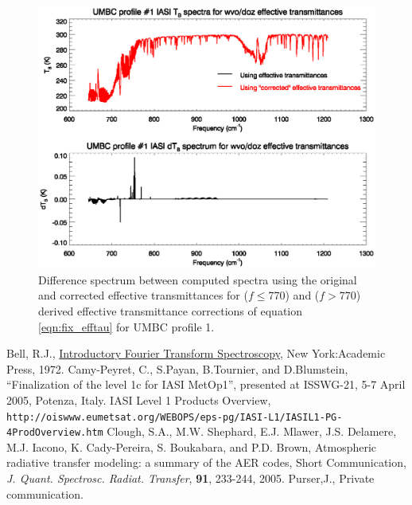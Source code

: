 \begin{figure}[htp]
  \centering
  \includegraphics[bb=70 219 540 395,clip,scale=0.8]{graphics/dozwvo_rtdiff.eps}
  \caption{Difference spectrum between computed spectra using the original and corrected effective transmittances for  ($f\leq$770\invcm) and  ($f>$770\invcm) derived effective transmittance corrections of equation \ref{eqn:fix_efftau} for UMBC profile 1.}
  \label{fig:dozwvo_rtdiff}
\end{figure}



\begin{thebibliography}{99}
   Bell, R.J., \underline{Introductory Fourier Transform Spectroscopy}, New York:Academic Press, 1972.
   Camy-Peyret, C., S.Payan, B.Tournier, and D.Blumstein, ``Finalization of the level 1c for IASI MetOp1'', presented at ISSWG-21, 5-7 April 2005, Potenza, Italy.
   IASI Level 1 Products Overview,\\ \texttt{http://oiswww.eumetsat.org/WEBOPS/eps-pg/IASI-L1/IASIL1-PG-4ProdOverview.htm}
   Clough, S.A., M.W. Shephard, E.J. Mlawer, J.S. Delamere, M.J. Iacono, K. Cady-Pereira, S. Boukabara, and P.D. Brown, Atmospheric radiative transfer modeling: a summary of the AER codes, Short Communication, {\it J. Quant. Spectrosc. Radiat. Transfer}, {\bf 91}, 233-244, 2005.
   Purser,J., Private communication.


\end{thebibliography}



\begin{appendix}

  

\end{appendix}


